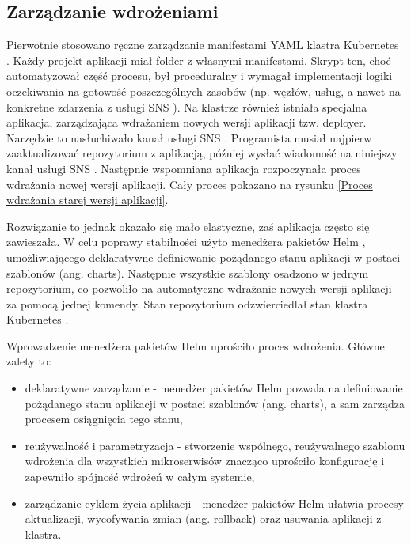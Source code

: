 \subsection{Zarządzanie wdrożeniami}

Pierwotnie stosowano ręczne zarządzanie manifestami YAML \cite{yaml_spec} klastra Kubernetes \cite{kubernetes}. Każdy projekt aplikacji miał folder z własnymi manifestami. Skrypt ten, choć automatyzował część procesu, był proceduralny i wymagał implementacji logiki oczekiwania na gotowość poszczególnych zasobów (np. węzłów, usług, a nawet na konkretne zdarzenia z usługi SNS \cite{sns_docs}). Na klastrze również istniała specjalna aplikacja, zarządzająca wdrażaniem nowych wersji aplikacji tzw. deployer. Narzędzie to nasłuchiwało kanał usługi SNS \cite{sns_docs}. Programista musiał najpierw zaaktualizować repozytorium z aplikacją, później wysłać wiadomość na niniejszy kanał usługi SNS \cite{sns_docs}. Następnie wspomniana aplikacja rozpoczynała proces wdrażania nowej wersji aplikacji. Cały proces pokazano na rysunku \ref{Proces wdrażania starej wersji aplikacji}.


Rozwiązanie to jednak okazało się mało elastyczne, zaś aplikacja często się zawieszała. W celu poprawy stabilności użyto menedżera pakietów Helm \cite{helm_docs}, umożliwiającego deklaratywne definiowanie pożądanego stanu aplikacji w postaci szablonów (ang. \mbox{charts}). Następnie wszystkie szablony osadzono w jednym repozytorium, co pozwoliło na automatyczne wdrażanie nowych wersji aplikacji za pomocą jednej komendy. Stan repozytorium odzwierciedlał stan klastra Kubernetes \cite{kubernetes}.

Wprowadzenie menedżera pakietów Helm \cite{helm_docs} uprościło proces wdrożenia. Główne zalety to:

\vspace{0.3em}

\begin{itemize}
    \item deklaratywne zarządzanie - menedżer pakietów Helm \cite{helm_docs} pozwala na definiowanie pożądanego stanu aplikacji w postaci szablonów (ang. charts), a sam zarządza procesem osiągnięcia tego stanu,
    \item reużywalność i parametryzacja - stworzenie wspólnego, reużywalnego szablonu wdrożenia dla wszystkich mikroserwisów znacząco uprościło konfigurację i zapewniło spójność wdrożeń w całym systemie,
    \item zarządzanie cyklem życia aplikacji - menedżer pakietów Helm \cite{helm_docs} ułatwia procesy aktualizacji, wycofywania zmian (ang. rollback) oraz usuwania aplikacji z klastra.
\end{itemize}

